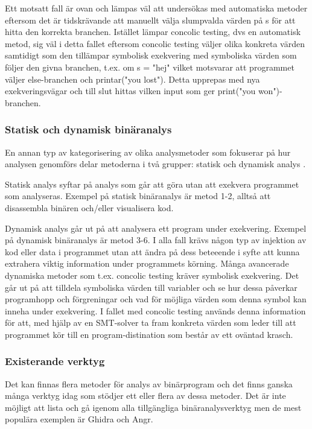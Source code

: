 Ett motsatt fall är ovan och lämpas väl att undersökas med automatiska
metoder eftersom det är tidskrävande att manuellt välja slumpvalda värden på s
för att hitta den korrekta branchen. Istället lämpar concolic testing, dvs en
automatisk metod, sig väl i detta fallet eftersom concolic testing väljer olika
konkreta värden samtidigt som den tillämpar symbolisk exekvering med symboliska
värden som följer den givna branchen, t.ex. om s = "hej" vilket motsvarar att
programmet väljer else-branchen och printar("you lost"). Detta upprepas med nya
exekveringsvägar och till slut hittas vilken input som ger print("you
won")-branchen. 


\subsubsection{Statisk och dynamisk binäranalys}
En annan typ av kategorisering av olika analysmetoder som fokuserar på hur
analysen genomförs delar metoderna i två grupper: statisk och dynamisk analys
\cite{dynamic_bin_analysis}.

Statisk analys syftar på analys som går att göra utan att exekvera programmet
som analyseras. Exempel på statisk binäranalys är metod 1-2, alltså att
disassembla binären och/eller visualisera kod.

Dynamisk analys går ut på att analysera ett program under exekvering. Exempel
på dynamisk binäranalys är metod 3-6. I alla fall krävs någon typ av injektion
av kod eller data i programmet utan att ändra på dess beteeende i syfte att
kunna extrahera viktig information under programmets körning. Många avancerade
dynamiska metoder som t.ex. concolic testing kräver symbolisk exekvering. Det
går ut på att tilldela symboliska värden till variabler och se hur dessa
påverkar programhopp och förgreningar och vad för möjliga värden som denna
symbol kan inneha under exekvering. I fallet med concolic testing används denna
information för att, med hjälp av en SMT-solver ta fram konkreta värden som
leder till att programmet kör till en program-distination som består av ett
oväntad krasch.

\subsubsection{Existerande verktyg}
Det kan finnas flera metoder för analys av binärprogram och det finns ganska
många verktyg idag som stödjer ett eller flera av dessa metoder. Det är inte
möjligt att lista och gå igenom alla tillgängliga binäranalysverktyg men de
mest populära exemplen är Ghidra\cite{ghidra_website} och
Angr\cite{angr_github}.

